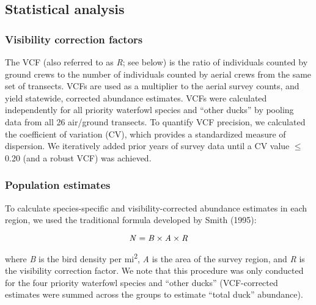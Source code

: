 \documentclass[
  12pt,
]{article}
\begin{document}
\hypertarget{statistical-analysis}{%
\subsection{Statistical analysis}\label{statistical-analysis}}

\hypertarget{visibility-correction-factors}{%
\subsubsection{Visibility correction
factors}\label{visibility-correction-factors}}

The VCF (also referred to as \emph{R}; see below) is the ratio of
individuals counted by ground crews to the number of individuals counted
by aerial crews from the same set of transects. VCFs are used as a
multiplier to the aerial survey counts, and yield statewide, corrected
abundance estimates. VCFs were calculated independently for all priority
waterfowl species and ``other ducks'' by pooling data from all 26
air/ground transects. To quantify VCF precision, we calculated the
coefficient of variation (CV), which provides a standardized measure of
dispersion. We iteratively added prior years of survey data until a CV
value \(\leq\) 0.20 (and a robust VCF) was achieved.

\hypertarget{population-estimates}{%
\subsubsection{Population estimates}\label{population-estimates}}

To calculate species-specific and visibility-corrected abundance
estimates in each region, we used the traditional formula developed by
Smith (1995):

\begin{equation}
{\text{\textit{N}}} = {\text{\textit{B}}} \times {\text{\textit{A}}} \times {\text{\textit{R}}}
\end{equation}

where \emph{B} is the bird density per mi\textsuperscript{2}, \emph{A}
is the area of the survey region, and \emph{R} is the visibility
correction factor. We note that this procedure was only conducted for
the four priority waterfowl species and ``other ducks'' (VCF-corrected
estimates were summed across the groups to estimate ``total duck''
abundance).
\end{document}
